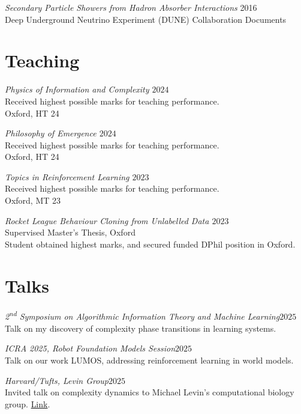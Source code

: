 \documentclass[margin]{res}
\begin{document}
\begin{resume}
                {\sl Secondary Particle Showers from Hadron Absorber Interactions} \hfill 2016 \\
                Deep Underground Neutrino Experiment (DUNE) Collaboration Documents


                \section{Teaching}
                        {\sl Physics of Information and Complexity \hfill $2024$}\\
                        Received highest possible marks for teaching performance.\\
                Oxford, HT 24

                {\sl Philosophy of Emergence \hfill $2024$}\\
                Received highest possible marks for teaching performance.\\
                Oxford, HT 24

                {\sl Topics in Reinforcement Learning \hfill $2023$}\\
                Received highest possible marks for teaching performance.\\
                Oxford, MT 23

                {\sl Rocket League Behaviour Cloning from Unlabelled Data \hfill $2023$}\\
                Supervised Master's Thesis, Oxford\\
                Student obtained highest marks, and secured funded DPhil position in Oxford.

                \section{Talks}
                {\sl 2\textsuperscript{nd} Symposium on Algorithmic Information Theory and Machine Learning\hfill $2025$}\\
                Talk on my discovery of complexity phase transitions in learning systems.

                {\sl ICRA 2025, Robot Foundation Models Session\hfill $2025$}\\
                Talk on our work LUMOS, addressing reinforcement learning in world models.

                {\sl Harvard/Tufts, Levin Group\hfill $2025$}\\
                Invited talk on complexity dynamics to Michael Levin's computational biology group. \href{https://www.youtube.com/watch?v=gb0z8lV1i78}{Link}.


\end{resume}
\end{document}
